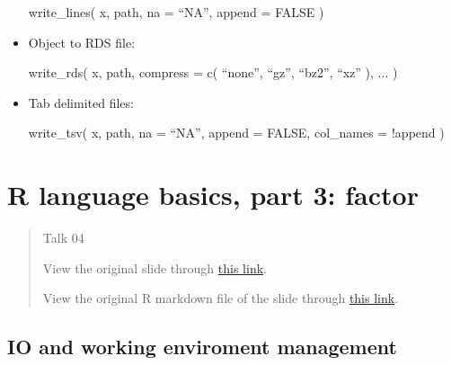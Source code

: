 \documentclass[
]{article}
\newenvironment{Shaded}{}{}
\newcommand{\AttributeTok}[1]{\textcolor[rgb]{0.49,0.56,0.16}{#1}}
\newcommand{\ConstantTok}[1]{\textcolor[rgb]{0.53,0.00,0.00}{#1}}
\newcommand{\FunctionTok}[1]{\textcolor[rgb]{0.02,0.16,0.49}{#1}}
\newcommand{\NormalTok}[1]{#1}
\newcommand{\SpecialCharTok}[1]{\textcolor[rgb]{0.25,0.44,0.63}{#1}}
\begin{document}
\begin{itemize}
\begin{Shaded}
\begin{Highlighting}[]
\FunctionTok{write\_lines}\NormalTok{(}
\NormalTok{  x,}
\NormalTok{  path,}
  \AttributeTok{na =}\NormalTok{ “NA”, }
  \AttributeTok{append =} \ConstantTok{FALSE}
\NormalTok{) }
\end{Highlighting}
\end{Shaded}
\item
  Object to RDS file:

\begin{Shaded}
\begin{Highlighting}[]
\FunctionTok{write\_rds}\NormalTok{(}
\NormalTok{  x,}
\NormalTok{  path, }
  \AttributeTok{compress =} 
  	\FunctionTok{c}\NormalTok{(}
\NormalTok{      “none”,}
\NormalTok{      “gz”,}
\NormalTok{      “bz2”,}
\NormalTok{      “xz”}
\NormalTok{    ),}
\NormalTok{  ...}
\NormalTok{)}
\end{Highlighting}
\end{Shaded}
\item
  Tab delimited files:

\begin{Shaded}
\begin{Highlighting}[]
\FunctionTok{write\_tsv}\NormalTok{(}
\NormalTok{  x, }
\NormalTok{  path, }
  \AttributeTok{na =}\NormalTok{ “NA”, }
  \AttributeTok{append =} \ConstantTok{FALSE}\NormalTok{, }
  \AttributeTok{col\_names =} \SpecialCharTok{!}\NormalTok{append}
\NormalTok{)}
\end{Highlighting}
\end{Shaded}
\end{itemize}

\hypertarget{r-language-basics-part-3-factor}{%
\section{R language basics, part 3:
factor}\label{r-language-basics-part-3-factor}}

\begin{quote}
Talk 04

View the original slide through \href{../talk04.pdf}{this link}.

View the original R markdown file of the slide through
\href{../talk04.Rmd}{this link}.
\end{quote}

\hypertarget{io-and-working-enviroment-management}{%
\subsection{IO and working enviroment
management}\label{io-and-working-enviroment-management}}
\end{document}
